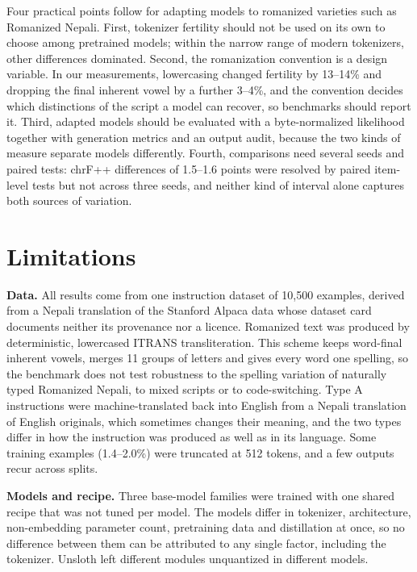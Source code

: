 \documentclass{article}
\begin{document}
Four practical points follow for adapting models to romanized varieties such as Romanized Nepali. First, tokenizer fertility should not be used on its own to choose among pretrained models; within the narrow range of modern tokenizers, other differences dominated. Second, the romanization convention is a design variable. In our measurements, lowercasing changed fertility by 13–14\% and dropping the final inherent vowel by a further 3–4\%, and the convention decides which distinctions of the script a model can recover, so benchmarks should report it. Third, adapted models should be evaluated with a byte-normalized likelihood together with generation metrics and an output audit, because the two kinds of measure separate models differently. Fourth, comparisons need several seeds and paired tests: chrF++ differences of 1.5–1.6 points were resolved by paired item-level tests but not across three seeds, and neither kind of interval alone captures both sources of variation.

\section{Limitations}\label{sec:limitations}

\textbf{Data.} All results come from one instruction dataset of 10,500 examples, derived from a Nepali translation of the Stanford Alpaca data whose dataset card documents neither its provenance nor a licence. Romanized text was produced by deterministic, lowercased ITRANS transliteration. This scheme keeps word-final inherent vowels, merges 11 groups of letters and gives every word one spelling, so the benchmark does not test robustness to the spelling variation of naturally typed Romanized Nepali, to mixed scripts or to code-switching. Type A instructions were machine-translated back into English from a Nepali translation of English originals, which sometimes changes their meaning, and the two types differ in how the instruction was produced as well as in its language. Some training examples (1.4–2.0\%) were truncated at 512 tokens, and a few outputs recur across splits.

\textbf{Models and recipe.} Three base-model families were trained with one shared recipe that was not tuned per model. The models differ in tokenizer, architecture, non-embedding parameter count, pretraining data and distillation at once, so no difference between them can be attributed to any single factor, including the tokenizer. Unsloth left different modules unquantized in different models.
\end{document}
